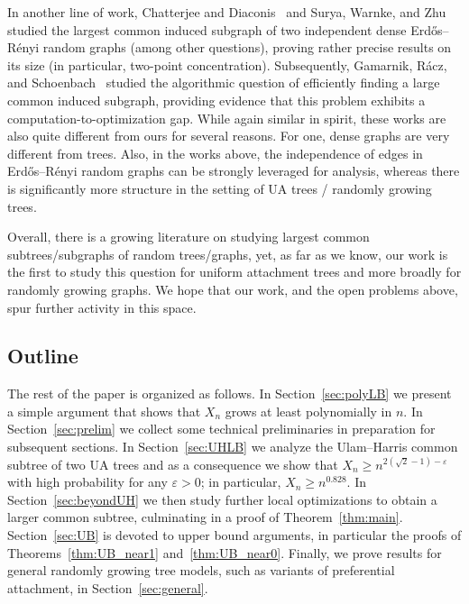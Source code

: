 \documentclass[11pt]{article}
\numberwithin{equation}{section}
\newcommand{\eps}{\varepsilon} %
\theoremstyle{definition}
\begin{document}
In another line of work, Chatterjee and Diaconis~\cite{chatterjee2023isomorphisms} and Surya, Warnke, and Zhu~\cite{surya2025isomorphisms} studied the largest common induced subgraph of two independent dense Erd\H{o}s--R\'enyi random graphs (among other questions), 
proving rather precise results on its size (in particular, two-point concentration). 
Subsequently, 
Gamarnik, R\'acz, and Schoenbach~\cite{GRS26} studied the algorithmic question of efficiently finding a large common induced subgraph, providing evidence that this problem exhibits a computation-to-optimization gap.
While again similar in spirit, these works are also quite different from ours for several reasons. 
For one, dense graphs are very different from trees. 
Also, in the works above, the independence of edges in Erd\H{o}s--R\'enyi random graphs can be strongly leveraged for analysis, whereas there is significantly more structure in the setting of UA trees / randomly growing trees. 


Overall, there is a growing literature on studying largest common subtrees/subgraphs of random trees/graphs, yet, as far as we know, our work is the first to study this question for uniform attachment trees and more broadly for randomly growing graphs.
We hope that our work, and the open problems above, spur further activity in this space. 



\subsection{Outline}

The rest of the paper is organized as follows. 
In Section~\ref{sec:polyLB} we present a simple argument that shows that $X_{n}$ grows at least polynomially in $n$. 
In Section~\ref{sec:prelim} we collect some technical preliminaries in preparation for subsequent sections. In Section~\ref{sec:UHLB} we analyze 
the Ulam--Harris common subtree
of two UA trees 
and as a consequence we show that $X_{n} \geq n^{2(\sqrt{2}-1) - \eps}$ with high probability for any $\eps > 0$; in particular, $X_{n} \geq n^{0.828}$. 
In Section~\ref{sec:beyondUH} we then study further local optimizations to obtain a larger common subtree, culminating in a proof of Theorem~\ref{thm:main}. 
Section~\ref{sec:UB} is devoted to upper bound arguments, in particular the proofs of Theorems~\ref{thm:UB_near1} and~\ref{thm:UB_near0}. 
Finally, we prove results for general randomly growing tree models, such as variants of preferential attachment, in Section~\ref{sec:general}.
\end{document}
